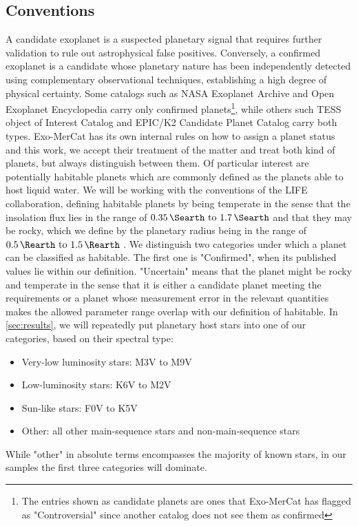 \subsection{Conventions}
\label{sec:conventions}
A candidate exoplanet is a suspected planetary signal that requires further validation to rule out astrophysical false positives. Conversely, a confirmed exoplanet is a candidate whose planetary nature has been independently detected using complementary observational techniques, establishing a high degree of physical certainty. Some catalogs such as NASA Exoplanet Archive and Open Exoplanet Encyclopedia carry only confirmed planets\footnote{The entries shown as candidate planets are ones that Exo-MerCat has flagged as "Controversial" since another catalog does not see them as confirmed}, while others such TESS object of Interest Catalog and EPIC/K2 Candidate Planet Catalog carry both types. Exo-MerCat has its own internal rules on how to assign a planet status and this work, we accept their treatment of the matter and treat both kind of planets, but always distinguish between them.
Of particular interest are potentially habitable planets which are commonly defined as the planets able to host liquid water. We will be working with the conventions of the LIFE collaboration, defining habitable planets by being temperate in the sense that the insolation flux lies in the range of $\qtyrange{0.35}{1.7}{\Searth}$ \cite{Kopparapu_2014} and that they may be rocky, which we define by the planetary radius being in the range of $\qtyrange{0.5}{1.5}{\Rearth}$ \cite{life4} \label{lab:hz_def}.
We distinguish two categories under which a planet can be classified as habitable. The first one is "Confirmed", when its published values lie within our definition. "Uncertain" means that the planet might be rocky and temperate in the sense that it is either a candidate planet meeting the requirements or a planet whose measurement error in the relevant quantities makes the allowed parameter range overlap with our definition of habitable.
In \cref{sec:results}, we will repeatedly put planetary host stars into one of our categories, based on their spectral type: 
\begin{itemize}
    \item Very-low luminosity stars: M3V to M9V
    \item Low-luminosity stars: K6V to M2V
    \item Sun-like stars: F0V to K5V
    \item Other: all other main-sequence stars and non-main-sequence stars
\end{itemize}
While "other" in absolute terms encompasses the majority of known stars, in our samples the first three categories will dominate.
